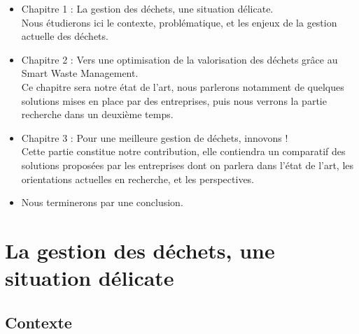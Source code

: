 \documentclass[a4paper,12pt]{report}
\begin{document}
\begin{itemize}
\item Chapitre 1 : La gestion des déchets, une situation délicate.\\
Nous étudierons ici le contexte, problématique, et les enjeux de la gestion actuelle des déchets.
\item Chapitre 2 : Vers une optimisation de la valorisation des déchets grâce au Smart Waste Management.\\
Ce chapitre sera notre état de l'art, nous parlerons notamment de quelques solutions mises en place par des entreprises, puis nous verrons la partie recherche dans un deuxième temps. 
\item Chapitre 3 : Pour une meilleure gestion de déchets, innovons !\\
Cette partie constitue notre contribution, elle contiendra un comparatif des solutions proposées par les entreprises dont on parlera dans l'état de l'art, les orientations actuelles en recherche, et les perspectives. 
\item Nous terminerons par une conclusion.
\end{itemize}

\chapter{La gestion des déchets, une situation délicate}
\section{Contexte}
\end{document}
